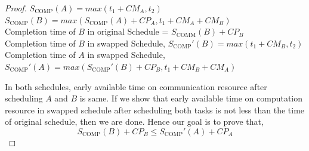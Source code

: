 \documentclass[sigconf]{acmart}
\newcommand{\scomm}{\ensuremath{{S}_{\text{COMM}}}}
\newcommand{\scomp}{\ensuremath{{S}_{\text{COMP}}}}
\begin{document}
\begin{proof}
			\noindent $\scomp(A) = max(t_1 + CM_A, t_2)$ \\
			\noindent $\scomp(B) = max(\scomp(A) + CP_A,  t_1 + CM_A + CM_B)$\\

		
		\noindent Completion time of $B$ in original Schedule = $\scomm(B) + CP_B$\\
		\noindent Completion time of $B$ in swapped Schedule,  $\scomp '(B)  =  max(t_1 + CM_B, t_2)$\\
		\noindent Completion time of $A$ in swapped Schedule, $ \scomp '(A) = max(\scomp'(B) + CP_B, t_1 + CM_B + CM_A)$
		
		
		In both schedules, early available time on communication resource after scheduling $A$ and $B$ is same. If we show that early available time on computation resource in swapped schedule after scheduling both tasks is not less than the time of original schedule, then we are done. Hence our goal is to prove that,		
		$$\scomp(B) + CP_B \le \scomp'(A) + CP_A $$
		
		
		

\end{proof}
\end{document}

